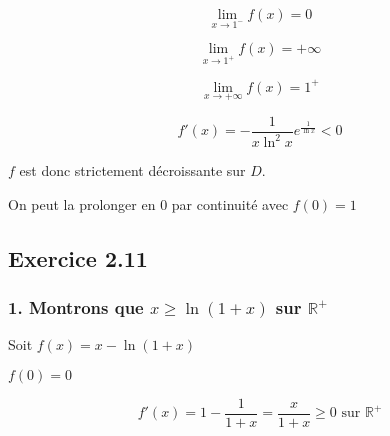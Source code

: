 \documentclass[a4paper,10pt]{report}
\begin{document}
\begin{displaymath}
	\lim_{x \rightarrow 1^{-}} f(x) = 0
\end{displaymath}

\begin{displaymath}
	\lim_{x \rightarrow 1^{+}} f(x) = +\infty
\end{displaymath}

\begin{displaymath}
	\lim_{x \rightarrow +\infty} f(x) = 1^{+}
\end{displaymath}

\begin{displaymath}
	f'(x) =-\frac{1}{x\ln^2 x} e^{\frac{1}{\ln x}} < 0
\end{displaymath}

$f$ est donc strictement décroissante sur $D$.


On peut la prolonger en $0$ par continuité avec $f(0) = 1$



\subsection*{Exercice 2.11}
\subsubsection*{1. Montrons que $x \geq \ln(1+x)$ sur $\mathbb{R}^+$}

Soit $f(x) = x - \ln(1+x)$

$f(0) = 0$

\begin{displaymath}
	f'(x) = 1 - \frac{1}{1+x} = \frac{x}{1+x} \geq 0 \text{ sur } \mathbb{R}^{+}
\end{displaymath}
\end{document}
